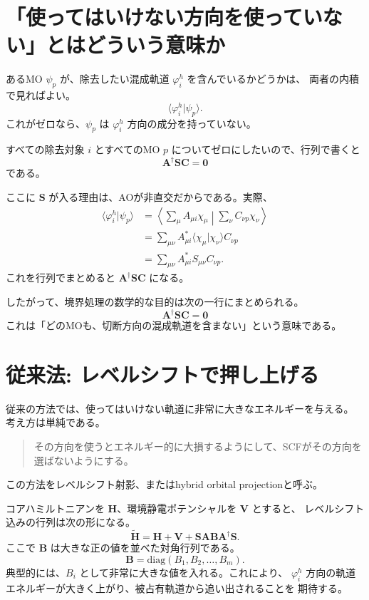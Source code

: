 \documentclass[uplatex,dvipdfmx,11pt]{jsarticle}
\newcommand{\Hcore}{\mathbf H}
\newcommand{\Venv}{\mathbf V}
\newcommand{\Smat}{\mathbf S}
\newcommand{\Amat}{\mathbf A}
\newcommand{\Bmat}{\mathbf B}
\newcommand{\Cmat}{\mathbf C}
\begin{document}
\section{「使ってはいけない方向を使っていない」とはどういう意味か}

あるMO \(\psi_p\) が、除去したい混成軌道 \(\varphi_i^h\) を含んでいるかどうかは、
両者の内積で見ればよい。
\[
  \langle \varphi_i^h | \psi_p \rangle .
\]
これがゼロなら、\(\psi_p\) は \(\varphi_i^h\) 方向の成分を持っていない。

すべての除去対象 \(i\) とすべてのMO \(p\) についてゼロにしたいので、行列で書くと
\[
  \Amat^\dagger \Smat \Cmat = \mathbf 0
\]
である。

ここに \(\Smat\) が入る理由は、AOが非直交だからである。実際、
\begin{align*}
\langle \varphi_i^h | \psi_p \rangle
&=
\left\langle
\sum_\mu A_{\mu i}\chi_\mu
\middle|
\sum_\nu C_{\nu p}\chi_\nu
\right\rangle \\
&=
\sum_{\mu\nu} A_{\mu i}^{*}
\langle \chi_\mu | \chi_\nu \rangle
C_{\nu p} \\
&=
\sum_{\mu\nu} A_{\mu i}^{*} S_{\mu\nu} C_{\nu p}.
\end{align*}
これを行列でまとめると \(\Amat^\dagger\Smat\Cmat\) になる。

したがって、境界処理の数学的な目的は次の一行にまとめられる。
\[
  \boxed{\Amat^\dagger \Smat \Cmat = \mathbf 0}
\]
これは「どのMOも、切断方向の混成軌道を含まない」という意味である。

\section{従来法: レベルシフトで押し上げる}

従来の方法では、使ってはいけない軌道に非常に大きなエネルギーを与える。
考え方は単純である。

\begin{quote}
その方向を使うとエネルギー的に大損するようにして、SCFがその方向を選ばないようにする。
\end{quote}

この方法をレベルシフト射影、またはhybrid orbital projectionと呼ぶ。

コアハミルトニアンを \(\Hcore\)、環境静電ポテンシャルを \(\Venv\) とすると、
レベルシフト込みの行列は次の形になる。
\[
  \widetilde{\Hcore}
  =
  \Hcore+\Venv+\Smat\Amat\Bmat\Amat^\dagger\Smat .
\]
ここで \(\Bmat\) は大きな正の値を並べた対角行列である。
\[
  \Bmat = \mathrm{diag}(B_1,B_2,\ldots,B_m).
\]
典型的には、\(B_i\) として非常に大きな値を入れる。これにより、
\(\varphi_i^h\) 方向の軌道エネルギーが大きく上がり、被占有軌道から追い出されることを
期待する。
\end{document}
